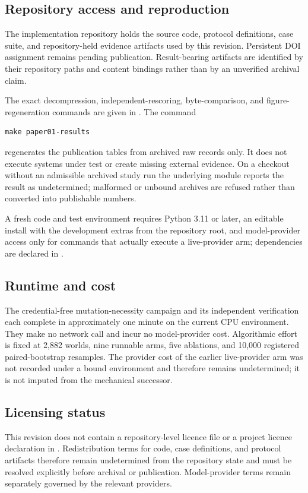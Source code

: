 \subsection{Repository access and reproduction}
The implementation repository holds the source code, protocol definitions, case
suite, and repository-held evidence artifacts used by this revision. Persistent
DOI assignment remains pending publication. Result-bearing artifacts are identified by their repository paths
and content bindings rather than by an unverified archival claim.

The exact decompression, independent-rescoring, byte-comparison, and
figure-regeneration commands are given in . The command
\begin{verbatim}
make paper01-results
\end{verbatim}
regenerates the publication tables from archived raw records only. It does not
execute systems under test or create missing external evidence. On a checkout
without an admissible archived study run the underlying module reports the
result as undetermined; malformed or unbound archives are refused rather than
converted into publishable numbers.

A fresh code and test environment requires Python 3.11 or later, an editable
install with the development extras from the repository root, and
model-provider access only for commands that actually execute a live-provider
arm; dependencies are declared in .

\subsection{Runtime and cost}
The credential-free mutation-necessity campaign and its independent
verification each complete in approximately one minute on the current CPU
environment. They make no network call and incur no model-provider cost.
Algorithmic effort is fixed at 2,882 worlds, nine runnable arms, five ablations,
and 10,000 registered paired-bootstrap resamples. The provider cost of the
earlier live-provider arm was not recorded under a bound environment and
therefore remains undetermined; it is not imputed from the mechanical
successor.

\subsection{Licensing status}
This revision does not contain a repository-level licence file or a project
licence declaration in . Redistribution terms for code, case
definitions, and protocol artifacts therefore remain undetermined from the
repository state and must be resolved explicitly before archival or
publication. Model-provider terms remain separately governed by the relevant
providers.

